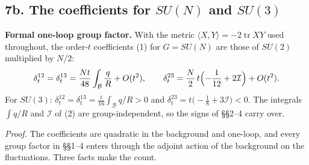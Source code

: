 \documentclass[11pt,a4paper]{article}
\begin{document}
\hypertarget{b.-the-coefficients-for-sun-and-su3}{%
\subsection{\texorpdfstring{7b. The coefficients for \(SU(N)\) and
\(SU(3)\)}{7b. The coefficients for SU(N) and SU(3)}}\label{b.-the-coefficients-for-sun-and-su3}}

\textbf{Formal one-loop group factor.} With the metric
\(\langle X,Y\rangle=-2\operatorname{tr}XY\) used throughout, the
order-\(t\) coefficients (1) for \(G=SU(N)\) are those of \(SU(2)\)
multiplied by \(N/2\):
\[\delta_t^{12}=\delta_t^{13}=\frac{Nt}{48}\int_{\mathcal B}\frac qR+O(t^2),\qquad
\delta_t^{23}=\frac N2\,t\Bigl(-\frac1{12}+2\mathcal I\Bigr)+O(t^2).\]
For \(SU(3)\):
\(\delta_t^{12}=\delta_t^{13}=\frac t{16}\int_{\mathcal B}q/R>0\) and
\(\delta_t^{23}=t\bigl(-\frac18+3\mathcal I\bigr)<0\). The integrals
\(\int q/R\) and \(\mathcal I\) of (2) are group-independent, so the
signs of §§2--4 carry over.

\emph{Proof.} The coefficients are quadratic in the background and
one-loop, and every group factor in §§1--4 enters through the adjoint
action of the background on the fluctuations. Three facts make the
count.
\end{document}
